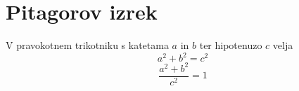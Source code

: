 \documentclass{article}
\begin{document}
\section*{Pitagorov izrek}
V pravokotnem trikotniku s katetama \(a\) in \(b\) ter hipotenuzo \(c\) velja
\[ a^2 + b^2 = c^2 \]
\[\frac{a^2 + b^2}{c^2} = 1\]
\end{document}
